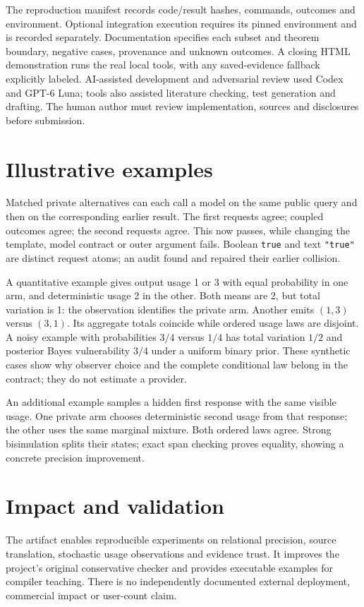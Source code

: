 \documentclass[preprint,12pt, a4paper]{elsarticle}
\begin{document}
The reproduction manifest records code/result hashes, commands, outcomes and environment. Optional integration execution requires its pinned environment and is recorded separately. Documentation specifies each subset and theorem boundary, negative cases, provenance and unknown outcomes. A closing HTML demonstration runs the real local tools, with any saved-evidence fallback explicitly labeled. AI-assisted development and adversarial review used Codex and GPT-6 Luna; tools also assisted literature checking, test generation and drafting. The human author must review implementation, sources and disclosures before submission.

\section{Illustrative examples}
Matched private alternatives can each call a model on the same public query and then on the corresponding earlier result. The first requests agree; coupled outcomes agree; the second requests agree. This now passes, while changing the template, model contract or outer argument fails. Boolean \texttt{true} and text \texttt{"true"} are distinct request atoms; an audit found and repaired their earlier collision.

A quantitative example gives output usage 1 or 3 with equal probability in one arm, and deterministic usage 2 in the other. Both means are 2, but total variation is 1: the observation identifies the private arm. Another emits $(1,3)$ versus $(3,1)$. Its aggregate totals coincide while ordered usage laws are disjoint. A noisy example with probabilities $3/4$ versus $1/4$ has total variation $1/2$ and posterior Bayes vulnerability $3/4$ under a uniform binary prior. These synthetic cases show why observer choice and the complete conditional law belong in the contract; they do not estimate a provider.

An additional example samples a hidden first response with the same visible usage. One private arm chooses deterministic second usage from that response; the other uses the same marginal mixture. Both ordered laws agree. Strong bisimulation splits their states; exact span checking proves equality, showing a concrete precision improvement.

\section{Impact and validation}
The artifact enables reproducible experiments on relational precision, source translation, stochastic usage observations and evidence trust. It improves the project's original conservative checker and provides executable examples for compiler teaching. There is no independently documented external deployment, commercial impact or user-count claim.
\end{document}
